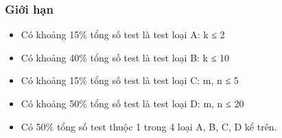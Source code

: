 \subsubsection{Giới hạn}
\begin{itemize}
	\item Có khoảng 15\% tổng số test là test loại A: k ≤ 2
	\item Có khoảng 40\% tổng số test là test loại B: k ≤ 10
	\item Có khoảng 15\% tổng số test là test loại C: m, n ≤ 5
	\item Có khoảng 50\% tổng số test là test loại D: m, n ≤ 20
	\item Có 50\% tổng số test thuộc 1 trong 4 loại A, B, C, D kể trên.
\end{itemize}
